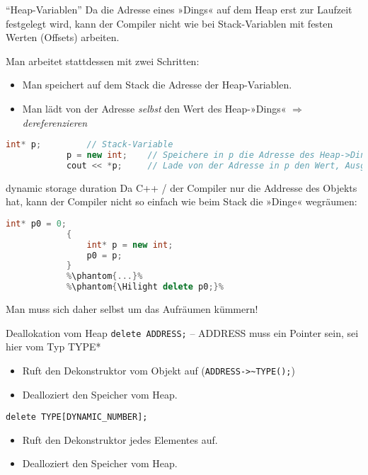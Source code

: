 \begin{frame}[fragile]{\enquote{Heap-Variablen}}
	Da die Adresse eines »Dings« auf dem Heap erst zur Laufzeit festgelegt wird, kann der Compiler nicht wie bei Stack-Variablen mit festen Werten (Offsets) arbeiten.
	
	\hspace{1em}
	\pause
	
	Man arbeitet stattdessen mit zwei Schritten:
	\begin{itemize}
		\item Man speichert auf dem Stack die Adresse der Heap-Variablen.
		\item Man lädt von der Adresse \emph{selbst} den Wert des Heap-»Dings« $\Rightarrow$ \emph{dereferenzieren}
	\end{itemize}
	\pause
	
	\footnotesize
	\begin{block}{}
		\begin{lstlisting}[language=C++]
			int* p;         // Stack-Variable
			p = new int;    // Speichere in p die Adresse des Heap->Dings<.
			cout << *p;     // Lade von der Adresse in p den Wert, Ausgabe.
		\end{lstlisting}
	\end{block}
\end{frame}

\begin{frame}[fragile]{dynamic storage duration}
	Da C++ / der Compiler nur die Addresse des Objekts hat, kann der Compiler nicht so einfach wie beim Stack die »Dinge« wegräumen:
	
	{\footnotesize
	\begin{block}{}
		\begin{lstlisting}[language=C++, escapechar=\%]
			int* p0 = 0;
			{
			    int* p = new int;
			    p0 = p;
			}
			%\phantom{...}%
			%\phantom{\Hilight delete p0;}%
		\end{lstlisting}
	\end{block}
	}
	
	Man muss sich daher selbst um das Aufräumen kümmern!
\end{frame}

\begin{frame}[fragile]{Deallokation vom Heap}
	\verb|delete ADDRESS;| -- ADDRESS muss ein Pointer sein, sei hier vom Typ TYPE*
	\begin{itemize}
		\item Ruft den Dekonstruktor vom Objekt auf (\verb|ADDRESS->~TYPE();|)
		\item Dealloziert den Speicher vom Heap.
	\end{itemize}
	
	\hspace*{4em}
	
	\verb|delete TYPE[DYNAMIC_NUMBER];|
	\begin{itemize}
		\item Ruft den Dekonstruktor jedes Elementes auf.
		\item Dealloziert den Speicher vom Heap.
	\end{itemize}
\end{frame}

